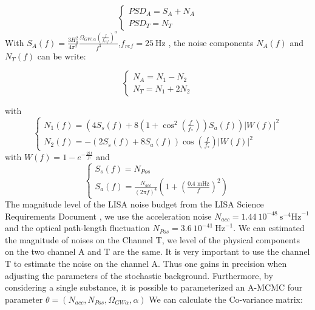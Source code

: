 \documentclass[a4paper,12pt]{article}
\begin{document}
\begin{equation}
\left\{
\begin{array}{l}
    PSD_A = S_A + N_A \\
  PSD_T = N_T
\end{array}
\right.
\end{equation}
With $S_A(f) = \frac{3H_0^2}{4 \pi^2} \frac{\Omega_{GW,\alpha}\left(\frac{f}{f_{ref}}\right)^{\alpha}}{f^3}$,$f_{ref}=25 \ \text{Hz}$ , the noise components $N_A(f)$ and $N_T(f)$ can be write:

\begin{equation}
\left\{
\begin{array}{l}
    N_A = N_1 - N_2 \\
    N_T = N_1 + 2 N_2 
\end{array}
\right.
\end{equation}

with 
\begin{equation}
\left\{
\begin{array}{l}
    N_1(f) = \left(4 S_s(f) + 8\left( 1 + \cos^2\left(\frac{f}{f_*}\right)\right) S_a(f)\right)|W(f)|^2 \\
    N_2(f) = -\left(2 S_s(f) + 8 S_a(f)\right)\cos\left(\frac{f}{f_*}\right)|W(f)|^2
\end{array}
\right.
\end{equation}
with $W(f) = 1 - e^{-\frac{2if}{f_*}}$ and 
\begin{equation}
\left\{
\begin{array}{l}
    S_s(f) = N_{Pos} \\
    S_a(f) = \frac{N_{acc}}{(2 \pi f)^4}\left( 1 + \left(\frac{0.4 \text{ mHz}}{f} \right)^2 \right)
\end{array}
\right.
\end{equation}
The magnitude level of the LISA noise budget from the LISA Science Requirements Document \cite{LSR}, we use the acceleration noise $N_{acc} = 1.44 \ 10^{-48} \ \text{s}^{-4}\text{Hz}^{-1}$ and the optical path-length fluctuation $N_{Pos} = 3.6 \ 10^{-41} \ \text{Hz}^{-1}$. We can estimated the magnitude of noises on the Channel T, we level of the physical components on the two channel A and T are the same. It is very important to use the channel T to estimate the noise on the channel A. Thus one gains in precision when adjusting the parameters of the stochastic background. Furthermore, by considering a single substance, it is possible to parameterized an A-MCMC four parameter $\theta = (N_{acc},N_{Pos},\Omega_{GW\alpha},\alpha)$
We can calculate the Co-variance matrix:
\end{document}
